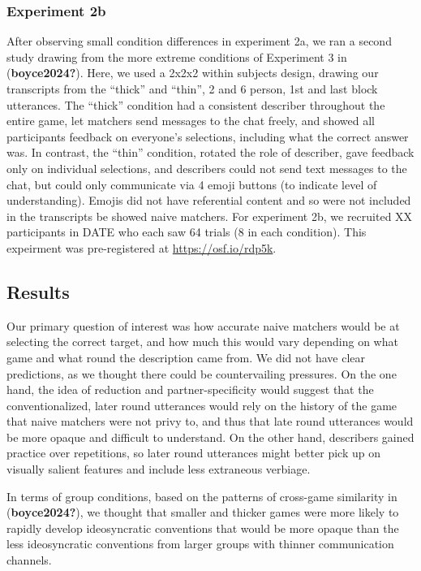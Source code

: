\documentclass[10pt, letterpaper]{article}
\begin{document}
\subsubsection{Experiment 2b}\label{experiment-2b}

After observing small condition differences in experiment 2a, we ran a
second study drawing from the more extreme conditions of Experiment 3 in
(\textbf{boyce2024?}). Here, we used a 2x2x2 within subjects design,
drawing our transcripts from the ``thick'' and ``thin'', 2 and 6 person,
1st and last block utterances. The ``thick'' condition had a consistent
describer throughout the entire game, let matchers send messages to the
chat freely, and showed all participants feedback on everyone's
selections, including what the correct answer was. In contrast, the
``thin'' condition, rotated the role of describer, gave feedback only on
individual selections, and describers could not send text messages to
the chat, but could only communicate via 4 emoji buttons (to indicate
level of understanding). Emojis did not have referential content and so
were not included in the transcripts be showed naive matchers. For
experiment 2b, we recruited XX participants in DATE who each saw 64
trials (8 in each condition). This expeirment was pre-registered at
\url{https://osf.io/rdp5k}.

\subsection{Results}\label{results}

Our primary question of interest was how accurate naive matchers would
be at selecting the correct target, and how much this would vary
depending on what game and what round the description came from. We did
not have clear predictions, as we thought there could be countervailing
pressures. On the one hand, the idea of reduction and
partner-specificity would suggest that the conventionalized, later round
utterances would rely on the history of the game that naive matchers
were not privy to, and thus that late round utterances would be more
opaque and difficult to understand. On the other hand, describers gained
practice over repetitions, so later round utterances might better pick
up on visually salient features and include less extraneous verbiage.

In terms of group conditions, based on the patterns of cross-game
similarity in (\textbf{boyce2024?}), we thought that smaller and thicker
games were more likely to rapidly develop ideosyncratic conventions that
would be more opaque than the less ideosyncratic conventions from larger
groups with thinner communication channels.
\end{document}
